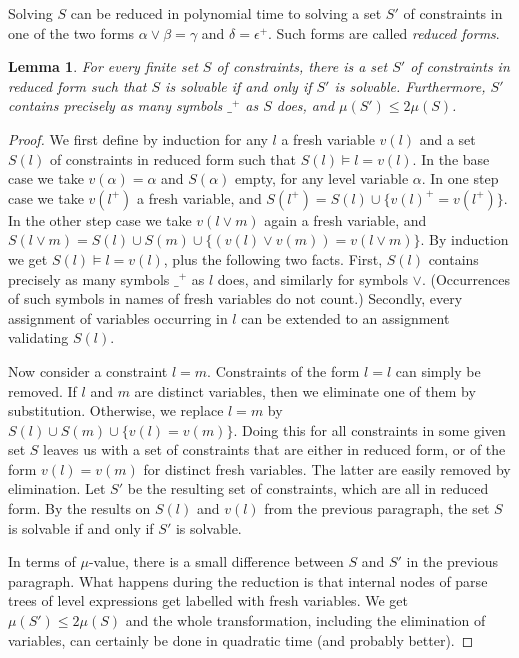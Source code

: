 \documentclass[11pt,a4paper]{article}
\newtheorem{lemma}{Lemma}[theorem]
\newcommand{\set}[1]{\{#1\}}
\begin{document}
Solving $S$ can be reduced in polynomial time to solving a set $S'$ of
constraints in one of the two forms $\alpha\vee\beta = \gamma$
and $\delta = \epsilon^+$. Such forms are called \emph{reduced forms}.

\begin{lemma}\label{lem:reduced-form}
For every finite set $S$ of constraints, there is a set $S'$ of
constraints in reduced form such that $S$ is solvable if and only if $S'$
is solvable. Furthermore, $S'$ contains precisely as many symbols $\_^+$ as $S$ does,
and $\mu(S')\leq 2\mu(S)$.
\end{lemma}

\begin{proof}
We first define by induction for any $l$ a fresh variable $v(l)$ and
a set $S(l)$ of constraints in reduced form such that $S(l)\models l = v(l)$.
In the base case we take $v(\alpha)=\alpha$ and $S(\alpha)$ empty, for any
level variable $\alpha$. In one step case we take $v(l^+)$ a fresh variable,
and $S(l^+) = S(l) \cup \set{v(l)^+ =v(l^+)}$.
In the other step case we take $v(l\vee m)$ again a fresh variable,
and $S(l\vee m) = S(l) \cup S(m) \cup \set{(v(l)\vee v(m)) =v(l\vee m)}$.
By induction we get $S(l)\models l = v(l)$, plus the following two facts.
First, $S(l)$ contains precisely as many symbols $\_^+$ as $l$ does,
and similarly for symbols $\vee$.
(Occurrences of such symbols in names of fresh variables do not count.)
Secondly, every assignment of variables occurring in $l$ can be extended to an
assignment validating $S(l)$.

Now consider a constraint $l=m$. Constraints of the form $l=l$ can
simply be removed. If $l$ and $m$ are distinct variables,
then we eliminate one of them by substitution. Otherwise,
we replace $l=m$ by $S(l)\cup S(m)\cup \set{v(l)=v(m)}$.
Doing this for all constraints in some given set $S$
leaves us with a set of constraints that are either in
reduced form, or of the form $v(l)=v(m)$ for distinct fresh variables.
The latter are easily removed by elimination. Let $S'$ be the resulting set
of constraints, which are all in reduced form. By the results on $S(l)$
and $v(l)$ from the previous paragraph, the set $S$ is solvable if
and only if $S'$ is solvable.

In terms of $\mu$-value, there is a small
difference between $S$ and $S'$ in the previous paragraph.
What happens during the reduction is that internal nodes
of parse trees of level expressions get labelled with fresh variables.
We get $\mu(S')\leq 2\mu(S)$ and the whole transformation, including the
elimination of variables, can certainly be done in quadratic time
(and probably better).
\end{proof}
\end{document}
